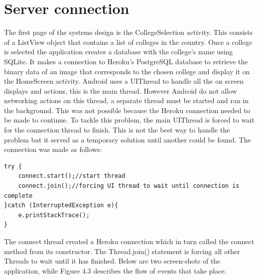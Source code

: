 \section{Server connection}
The first page of the systems design is the CollegeSelection activity. This consists of a ListView object that contains a list of colleges in the country. Once a college is selected the application creates a database with the college's name using SQLite. It makes a connection to Heroku's PostgreSQL database to retrieve the binary data of an image that corresponds to the chosen college and display it on the HomeScreen activity. Android uses a UIThread to handle all the on screen displays and actions, this is the main thread. However Android do not allow networking actions on this thread, a separate thread must be started and ran in the background. This was not possible because the Heroku connection needed to be made to continue. To tackle this problem, the main UIThread is forced to wait for the connection thread to finish. This is not the best way to handle the problem but it served as a temporary solution until another could be found. The connection was made as follows:

\begin{verbatim}
try {
	connect.start();//start thread
	connect.join();//forcing UI thread to wait until connection is complete
}catch (InterruptedException e){
	e.printStackTrace();
}
\end{verbatim}

The connect thread created a Heroku connection which in turn called the connect method from its constructor. The Thread.join() statement is forcing all other Threads to wait until it has finished. Below are two screen-shots of the application, while Figure 4.3 describes the flow of events that take place.


